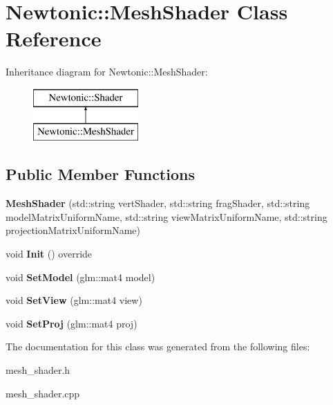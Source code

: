 \hypertarget{classNewtonic_1_1MeshShader}{}\section{Newtonic\+::Mesh\+Shader Class Reference}
\label{classNewtonic_1_1MeshShader}
Inheritance diagram for Newtonic\+::Mesh\+Shader\+:\begin{figure}[H]
\begin{center}
\leavevmode
\includegraphics[height=2.000000cm]{classNewtonic_1_1MeshShader}
\end{center}
\end{figure}
\subsection*{Public Member Functions}
\begin{DoxyCompactItemize}
\item 
\mbox{\label{classNewtonic_1_1MeshShader_af6a7812fe51d8227adf58860c6143fd2}} 
{\bfseries Mesh\+Shader} (std\+::string vert\+Shader, std\+::string frag\+Shader, std\+::string model\+Matrix\+Uniform\+Name, std\+::string view\+Matrix\+Uniform\+Name, std\+::string projection\+Matrix\+Uniform\+Name)
\item 
\mbox{\label{classNewtonic_1_1MeshShader_aae5fd51e6ce75aff781617800d5d5050}} 
void {\bfseries Init} () override
\item 
\mbox{\label{classNewtonic_1_1MeshShader_a887272844bb09ce0d9a8f565b1a970d5}} 
void {\bfseries Set\+Model} (glm\+::mat4 model)
\item 
\mbox{\label{classNewtonic_1_1MeshShader_ab6b14fc5db19fcffadd6129cc7282335}} 
void {\bfseries Set\+View} (glm\+::mat4 view)
\item 
\mbox{\label{classNewtonic_1_1MeshShader_ab153afb21fe2f8542854422301352877}} 
void {\bfseries Set\+Proj} (glm\+::mat4 proj)
\end{DoxyCompactItemize}


The documentation for this class was generated from the following files\+:\begin{DoxyCompactItemize}
\item 
mesh\+\_\+shader.\+h\item 
mesh\+\_\+shader.\+cpp\end{DoxyCompactItemize}
